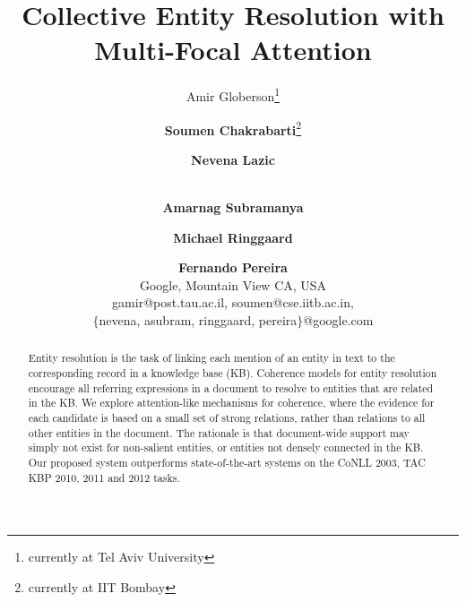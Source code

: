 \documentclass[11pt]{article}
\title{Collective Entity Resolution with Multi-Focal Attention}
\author{Amir Globerson\thanks{\;\;currently at Tel Aviv University} \and {\bf Soumen Chakrabarti}\thanks{\;\;currently at IIT Bombay} \and {\bf Nevena Lazic} \and \\ {\bf Amarnag Subramanya} \and {\bf Michael Ringgaard}
\and {\bf Fernando Pereira} \\ 
Google,  Mountain View CA, USA\\
gamir@post.tau.ac.il, soumen@cse.iitb.ac.in, \\ $\{$nevena, asubram, ringgaard, pereira$\}$@google.com}
\date{}
\begin{document}
\maketitle

\begin{abstract}
Entity resolution is the task of linking each mention of an entity in
text to the corresponding record in a knowledge base (KB).  Coherence
models for entity resolution encourage all referring expressions in a
document to resolve to entities that are related in the KB. 
We explore attention-like mechanisms for coherence, where the evidence for each
candidate is based on a small set of strong relations, rather than relations
to all other entities in the document. 
The rationale is that document-wide support may simply not exist 
for non-salient entities, or entities not densely connected in the KB.
Our proposed system outperforms state-of-the-art systems on the CoNLL 2003, TAC KBP 2010, 2011
and 2012 tasks.
\end{abstract}














\end{document}

